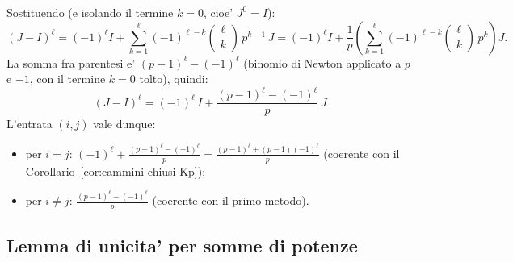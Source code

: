 
Sostituendo (e isolando il termine $ k = 0 $, cioe' $ J^0 = I $):
\[
  (J - I)^\ell
    = (-1)^\ell I + \sum_{k=1}^{\ell} (-1)^{\ell - k} \binom{\ell}{k}\, p^{k-1}\, J
    = (-1)^\ell I + \frac{1}{p}\!\left( \sum_{k=1}^{\ell} (-1)^{\ell - k} \binom{\ell}{k}\, p^k \right)\! J .
\]
La somma fra parentesi e' $ (p - 1)^\ell - (-1)^\ell $ (binomio di Newton applicato a $ p $ e $ -1 $, con il termine $ k = 0 $ tolto), quindi:
\[
  \boxed{\;(J - I)^\ell = (-1)^\ell\, I + \frac{(p-1)^\ell - (-1)^\ell}{p}\, J\;}
\]
L'entrata $ (i,j) $ vale dunque:
\begin{itemize}
  \item per $ i = j $: $ (-1)^\ell + \frac{(p-1)^\ell - (-1)^\ell}{p} = \frac{(p-1)^\ell + (p-1)(-1)^\ell}{p} $ (coerente con il Corollario~\ref{cor:cammini-chiusi-Kp});
  \item per $ i \neq j $: $ \frac{(p-1)^\ell - (-1)^\ell}{p} $ (coerente con il primo metodo).
\end{itemize}


\subsection{Lemma di unicita' per somme di potenze}

